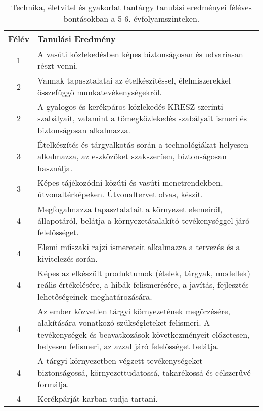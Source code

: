        
           \begin{longtable}{c | p{} }
            \caption[Technika, életvitel és gyakorlat 5-6.]{Technika, életvitel és gyakorlat tantárgy tanulási eredményei féléves bontásokban a 5-6. évfolyamszinteken. }  \\

            \textbf{Félév} & \textbf{Tanulási Eredmény} \\
            \hline
            \endhead
                                
                                          1 &  A vasúti közlekedésben képes biztonságosan és udvariasan részt venni. \\ \hline
                                      
                                
                                          2 &  Vannak tapasztalatai az ételkészítéssel, élelmiszerekkel összefüggő munkatevékenységekről. \\ \hline
                                          2 &  A gyalogos és kerékpáros közlekedés KRESZ szerinti szabályait, valamint a tömegközlekedés szabályait ismeri és biztonságosan alkalmazza. \\ \hline
                                      
                                
                                          3 &  Ételkészítés és tárgyalkotás során a technológiákat helyesen alkalmazza, az eszközöket szakszerűen, biztonságosan használja. \\ \hline
                                          3 &  Képes tájékozódni közúti és vasúti menetrendekben, útvonaltérképeken. Útvonaltervet olvas, készít. \\ \hline
                                      
                                
                                          4 &  Megfogalmazza tapasztalatait a környezet elemeiről, állapotáról, belátja a környezetátalakító tevékenységgel járó felelősséget. \\ \hline
                                          4 &  Elemi műszaki rajzi ismereteit alkalmazza a tervezés és a kivitelezés során. \\ \hline
                                          4 &  Képes az elkészült produktumok (ételek, tárgyak, modellek) reális értékelésére, a hibák felismerésére, a javítás, fejlesztés lehetőségeinek meghatározására. \\ \hline
                                          4 &  Az ember közvetlen tárgyi környezetének megőrzésére, alakítására vonatkozó szükségleteket felismeri. A tevékenységek és beavatkozások következményeit előzetesen, helyesen felismeri, az azzal járó felelősséget belátja. \\ \hline
                                          4 &  A tárgyi környezetben végzett tevékenységeket biztonságossá, környezettudatossá, takarékossá és célszerűvé formálja. \\ \hline
                                          4 &  Kerékpárját karban tudja tartani. \\ \hline
                                      
                        \end{longtable}
